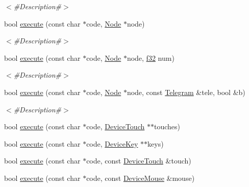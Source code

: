 \begin{DoxyCompactItemize}
\begin{DoxyCompactList}\small\item\em $<$\#\+Description\#$>$ \end{DoxyCompactList}\item 
bool \mbox{\hyperlink{classnjli_1_1_world_lua_virtual_machine_aeaf2624365c5c37dd5d90d7c9ab6d6a4}{execute}} (const char $\ast$code, \mbox{\hyperlink{classnjli_1_1_node}{Node}} $\ast$node)
\begin{DoxyCompactList}\small\item\em $<$\#\+Description\#$>$ \end{DoxyCompactList}\item 
bool \mbox{\hyperlink{classnjli_1_1_world_lua_virtual_machine_af224a80d62b53a01e22e64a9813af3c9}{execute}} (const char $\ast$code, \mbox{\hyperlink{classnjli_1_1_node}{Node}} $\ast$node, \mbox{\hyperlink{_util_8h_a5f6906312a689f27d70e9d086649d3fd}{f32}} num)
\begin{DoxyCompactList}\small\item\em $<$\#\+Description\#$>$ \end{DoxyCompactList}\item 
bool \mbox{\hyperlink{classnjli_1_1_world_lua_virtual_machine_a1ffc2b1e696b6c1a2d5955eaeca22d48}{execute}} (const char $\ast$code, \mbox{\hyperlink{classnjli_1_1_node}{Node}} $\ast$node, const \mbox{\hyperlink{classnjli_1_1_telegram}{Telegram}} \&tele, bool \&b)
\begin{DoxyCompactList}\small\item\em $<$\#\+Description\#$>$ \end{DoxyCompactList}\item 
bool \mbox{\hyperlink{classnjli_1_1_world_lua_virtual_machine_aa8c117a3268c12bee71d31be64a877d9}{execute}} (const char $\ast$code, \mbox{\hyperlink{classnjli_1_1_device_touch}{Device\+Touch}} $\ast$$\ast$touches)
\item 
bool \mbox{\hyperlink{classnjli_1_1_world_lua_virtual_machine_afd80dd6a43e8f7579ee9cd91ab2dc5e2}{execute}} (const char $\ast$code, \mbox{\hyperlink{classnjli_1_1_device_key}{Device\+Key}} $\ast$$\ast$keys)
\item 
bool \mbox{\hyperlink{classnjli_1_1_world_lua_virtual_machine_ab0a3f94a9fe51d41d8c8cef35c6295e5}{execute}} (const char $\ast$code, const \mbox{\hyperlink{classnjli_1_1_device_touch}{Device\+Touch}} \&touch)
\item 
bool \mbox{\hyperlink{classnjli_1_1_world_lua_virtual_machine_ae307c15aca8546f2df15a38514073b58}{execute}} (const char $\ast$code, const \mbox{\hyperlink{classnjli_1_1_device_mouse}{Device\+Mouse}} \&mouse)

\end{DoxyCompactItemize}
